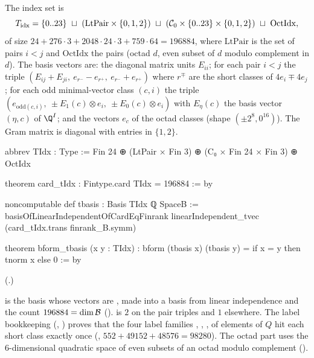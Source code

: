 \begin{definition}\label{ch21:def:tbasis}
The index set is
\begin{equation*}
  T_{\mathrm{idx}}=\{0..23\}\ \sqcup\ (\mathrm{LtPair}\times\{0,1,2\})\ \sqcup\ (\chXXIC_0\times\{0..23\}\times\{0,1,2\})\ \sqcup\ \mathrm{OctIdx},
\end{equation*}
of size $24+276\cdot3+2048\cdot24\cdot3+759\cdot64=196884$, where $\mathrm{LtPair}$ is the set of
pairs $i<j$ and $\mathrm{OctIdx}$ the pairs (octad $d$, even subset of $d$ modulo complement in $d$).
The basis vectors are: the diagonal matrix units $E_{ii}$; for each pair $i<j$ the triple
$(E_{ij}+E_{ji},\ e_{r^-}-e_{r^+},\ e_{r^-}+e_{r^+})$ where $r^\mp$ are the short classes of
$4e_i\mp4e_j$; for each odd minimal-vector class $(c,i)$ the triple $(e_{\mathrm{odd}(c,i)},\ \pm E_1(c)\otimes e_i,\ \pm E_0(c)\otimes e_i)$
with $E_\eta(c)$ the basis vector $(\eta,c)$ of $\Q^I$; and the vectors $e_c$ of the octad classes
(shape $(\pm2^8,0^{16})$).  The Gram matrix is diagonal with entries in $\{1,2\}$.
\end{definition}
\begin{leancode}
abbrev TIdx : Type := Fin 24 ⊕ (LtPair × Fin 3) ⊕ (C₀ × Fin 24 × Fin 3) ⊕ OctIdx
\end{leancode}
\begin{leancode}
theorem card_tIdx : Fintype.card TIdx = 196884 := by
\end{leancode}
\begin{leancode}
noncomputable def tbasis : Basis TIdx ℚ SpaceB :=
  basisOfLinearIndependentOfCardEqFinrank linearIndependent_tvec (card_tIdx.trans finrank_B.symm)
\end{leancode}
\begin{leancode}
theorem bform_tbasis (x y : TIdx) : bform (tbasis x) (tbasis y) = if x = y then tnorm x else 0 := by
\end{leancode}
(.)
\begin{dictionary}
 is the basis whose vectors are , made into a basis from linear independence
and the count $196884=\dim\mathcal{B}$ ().   is $2$ on the
pair triples and $1$ elsewhere.  The label bookkeeping (,
) proves that the four label families , ,
,  of elements of $Q$ hit each short class exactly once
(, $552+49152+48576=98280$).  The octad part uses the
$6$-dimensional quadratic space of even subsets of an octad modulo complement
().
\end{dictionary}
